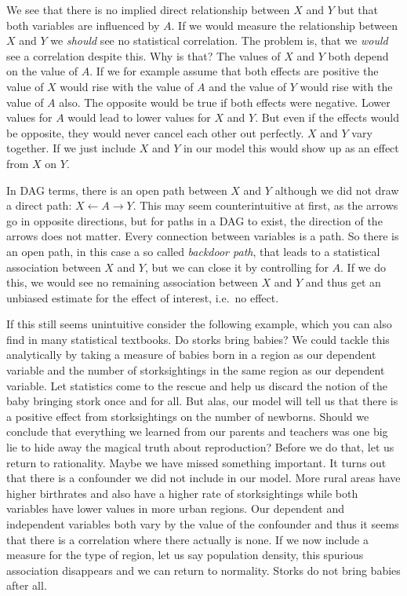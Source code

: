 \documentclass[
]{book}
\begin{document}
We see that there is no implied direct relationship between \(X\) and \(Y\)
but that both variables are influenced by \(A\). If we would measure the
relationship between \(X\) and \(Y\) we \emph{should} see no statistical
correlation. The problem is, that we \emph{would} see a correlation despite
this. Why is that? The values of \(X\) and \(Y\) both depend on the value of
\(A\). If we for example assume that both effects are positive the value
of \(X\) would rise with the value of \(A\) and the value of \(Y\) would rise
with the value of \(A\) also. The opposite would be true if both effects
were negative. Lower values for \(A\) would lead to lower values for \(X\)
and \(Y\). But even if the effects would be opposite, they would never
cancel each other out perfectly. \(X\) and \(Y\) vary together. If we just
include \(X\) and \(Y\) in our model this would show up as an effect from
\(X\) on \(Y\).

In DAG terms, there is an open path between \(X\) and \(Y\) although we did
not draw a direct path: \(X \leftarrow A \rightarrow Y\). This may seem
counterintuitive at first, as the arrows go in opposite directions, but
for paths in a DAG to exist, the direction of the arrows does not
matter. Every connection between variables is a path. So there is an
open path, in this case a so called \emph{backdoor path}, that leads to a
statistical association between \(X\) and \(Y\), but we can close it by
controlling for \(A\). If we do this, we would see no remaining
association between \(X\) and \(Y\) and thus get an unbiased estimate for
the effect of interest, i.e.~no effect.

If this still seems unintuitive consider the following example, which
you can also find in many statistical textbooks. Do storks bring babies?
We could tackle this analytically by taking a measure of babies born in
a region as our dependent variable and the number of storksightings in
the same region as our dependent variable. Let statistics come to the
rescue and help us discard the notion of the baby bringing stork once
and for all. But alas, our model will tell us that there is a positive
effect from storksightings on the number of newborns. Should we conclude
that everything we learned from our parents and teachers was one big lie
to hide away the magical truth about reproduction? Before we do that,
let us return to rationality. Maybe we have missed something important.
It turns out that there is a confounder we did not include in our model.
More rural areas have higher birthrates and also have a higher rate of
storksightings while both variables have lower values in more urban
regions. Our dependent and independent variables both vary by the value
of the confounder and thus it seems that there is a correlation where
there actually is none. If we now include a measure for the type of
region, let us say population density, this spurious association
disappears and we can return to normality. Storks do not bring babies
after all.
\end{document}
